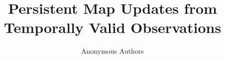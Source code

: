 \documentclass[10pt,twocolumn,letterpaper]{article}
\title{Persistent Map Updates from Temporally Valid Observations}
\author{Anonymous Authors}
\begin{document}
\maketitlesupplementary

{
\small


}
\end{document}
